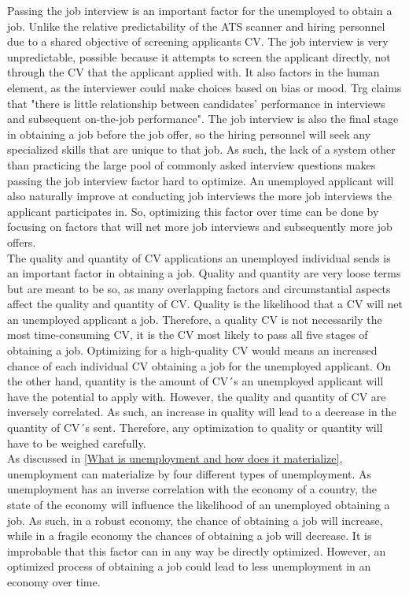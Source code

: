 Passing the job interview is an important factor for the unemployed to obtain a job.
Unlike the relative predictability of the ATS scanner and hiring personnel due to a shared objective of screening applicants CV.
The job interview is very unpredictable, possible because it attempts to screen the applicant directly, not through the CV that the applicant applied with.
It also factors in the human element, as the interviewer could make choices based on bias or mood.
Trg claims that "there is little relationship between candidates’ performance in interviews and subsequent on-the-job performance".\cite{Job_Interview}
The job interview is also the final stage in obtaining a job before the job offer, so the hiring personnel will seek any specialized skills that are unique to that job.
As such, the lack of a system other than practicing the large pool of commonly asked interview questions makes passing the job interview factor hard to optimize.\cite{Job_interview_common_questions}
An unemployed applicant will also naturally improve at conducting job interviews the more job interviews the applicant participates in.
So, optimizing this factor over time can be done by focusing on factors that will net more job interviews and subsequently more job offers. \\

The quality and quantity of CV applications an unemployed individual sends is an important factor in obtaining a job.
Quality and quantity are very loose terms but are meant to be so, as many overlapping factors and circumstantial aspects affect the quality and quantity of CV.
Quality is the likelihood that a CV will net an unemployed applicant a job.
Therefore, a quality CV is not necessarily the most time-consuming CV, it is the CV most likely to pass all five stages of obtaining a job.
Optimizing for a high-quality CV would means an increased chance of each individual CV obtaining a job for the unemployed applicant.
On the other hand, quantity is the amount of CV´s an unemployed applicant will have the potential to apply with.
However, the quality and quantity of CV are inversely correlated.
As such, an increase in quality will lead to a decrease in the quantity of CV´s sent.
Therefore, any optimization to quality or quantity will have to be weighed carefully. \\

As discussed in \ref{What is unemployment and how does it materialize}, unemployment can materialize by four different types of unemployment.
As unemployment has an inverse correlation with the economy of a country, the state of the economy will influence the likelihood of an unemployed obtaining a job.
As such, in a robust economy, the chance of obtaining a job will increase, while in a fragile economy the chances of obtaining a job will decrease.
It is improbable that this factor can in any way be directly optimized.
However, an optimized process of obtaining a job could lead to less unemployment in an economy over time. \\

